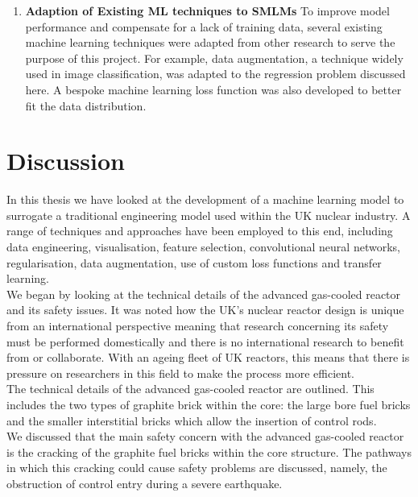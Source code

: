 \begin{enumerate}
	\item \textbf{Adaption of Existing ML techniques to SMLMs}
	To improve model performance and compensate for a lack of training data, several existing machine learning techniques were adapted from other research to serve the purpose of this project. For example, data augmentation, a technique widely used in image classification, was adapted to the regression problem discussed here. A bespoke machine learning loss function was also developed to better fit the data distribution. 
	
	
\end{enumerate}

\section{Discussion}

In this thesis we have looked at the development of a machine learning model to surrogate a traditional engineering  model used within the UK nuclear industry.   A range of techniques and approaches have been employed to this end, including data engineering, visualisation, feature selection, convolutional neural networks, regularisation, data augmentation, use of custom loss functions and transfer learning. \\

\noindent We began by looking at the technical details of the advanced gas-cooled reactor and its safety issues. It was noted how the UK's nuclear reactor design is unique from an international perspective meaning that research concerning its safety must be performed domestically and there is no international research to benefit from or collaborate. With an ageing fleet of UK reactors, this means that there is pressure on researchers in this field to make the process more efficient. \\

\noindent
The technical details of the advanced gas-cooled reactor are outlined. This includes the two types of graphite brick within the core: the large bore fuel bricks and the smaller interstitial bricks which allow the insertion of control rods. \\

\noindent
 We discussed that the main safety concern with the advanced gas-cooled reactor is the cracking of the graphite fuel bricks within the core structure. The pathways in which this cracking could cause safety problems are discussed, namely, the obstruction of control entry during a severe earthquake. \\
 
